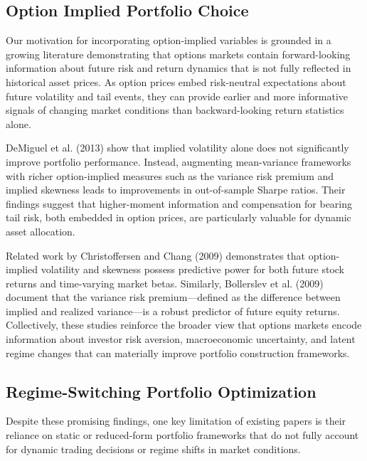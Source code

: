 \documentclass[12pt]{article}
\begin{document}

\subsection{Option Implied Portfolio Choice}

Our motivation for incorporating option-implied variables is grounded in a growing literature demonstrating that options markets contain forward-looking information about future risk and return dynamics that is not fully reflected in historical asset prices. As option prices embed risk-neutral expectations about future volatility and tail events, they can provide earlier and more informative signals of changing market conditions than backward-looking return statistics alone.

DeMiguel et al. (2013) show that implied volatility alone does not significantly improve portfolio performance. Instead, augmenting mean-variance frameworks with richer option-implied measures such as the variance risk premium and implied skewness leads to  improvements in out-of-sample Sharpe ratios. Their findings suggest that higher-moment information and compensation for bearing tail risk, both embedded in option prices, are particularly valuable for dynamic asset allocation.

Related work by Christoffersen and Chang (2009) demonstrates that option-implied volatility and skewness possess predictive power for both future stock returns and time-varying market betas. Similarly, Bollerslev et al. (2009) document that the variance risk premium---defined as the difference between implied and realized variance---is a robust predictor of future equity returns. Collectively, these studies reinforce the broader view that options markets encode information about investor risk aversion, macroeconomic uncertainty, and latent regime changes that can materially improve portfolio construction frameworks.



\subsection{Regime-Switching Portfolio Optimization}
Despite these promising findings, one key limitation of existing papers is their reliance on static or reduced-form portfolio frameworks that do not fully account for dynamic trading decisions or regime shifts in market conditions.
\end{document}
